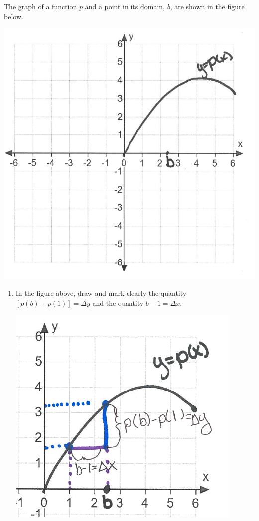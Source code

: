 \documentclass[nooutcomes, handout]{ximera}
\begin{document}
\begin{problem}

The graph of a function $p$ and a point in its domain, $b$, are shown in the figure below.
	        \begin{image}
          \includegraphics[scale = 0.5]{Figure6.png}
        \end{image}

	\begin{enumerate}
		\item In the figure above, draw and mark clearly the quantity $[p(b)-p(1)]=\Delta y$ and the quantity $b-1=\Delta x$.
		\begin{freeResponse}\hfil
	        \begin{image}
          \includegraphics[scale = 0.7]{Figure7.png}
        \end{image}


\end{freeResponse}
\end{enumerate}
\end{problem}
\end{document}

